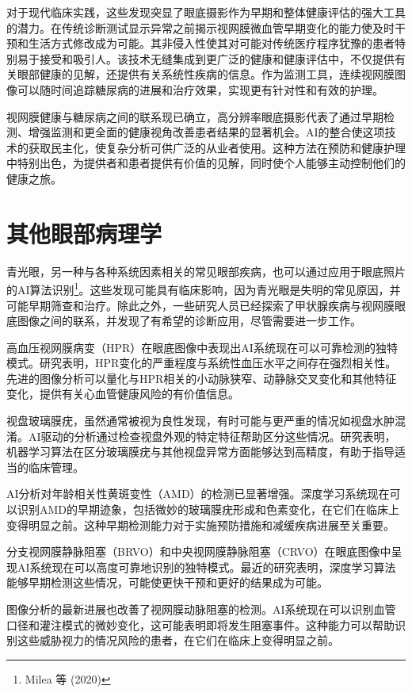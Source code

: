 \documentclass[
  Letterpaper,
]{scrbook}
\begin{document}
对于现代临床实践，这些发现突显了眼底摄影作为早期和整体健康评估的强大工具的潜力。在传统诊断测试显示异常之前揭示视网膜微血管早期变化的能力使及时干预和生活方式修改成为可能。其非侵入性使其对可能对传统医疗程序犹豫的患者特别易于接受和吸引人。该技术无缝集成到更广泛的健康和健康评估中，不仅提供有关眼部健康的见解，还提供有关系统性疾病的信息。作为监测工具，连续视网膜图像可以随时间追踪糖尿病的进展和治疗效果，实现更有针对性和有效的护理。

视网膜健康与糖尿病之间的联系现已确立，高分辨率眼底摄影代表了通过早期检测、增强监测和更全面的健康视角改善患者结果的显著机会。AI的整合使这项技术的获取民主化，使复杂分析可供广泛的从业者使用。这种方法在预防和健康护理中特别出色，为提供者和患者提供有价值的见解，同时使个人能够主动控制他们的健康之旅。

\section{其他眼部病理学}\label{ux5176ux4ed6ux773cux90e8ux75c5ux7406ux5b66}

青光眼，另一种与各种系统因素相关的常见眼部疾病，也可以通过应用于眼底照片的AI算法识别\footnote{Milea
  等 (2020)}。这些发现可能具有临床影响，因为青光眼是失明的常见原因，并可能早期筛查和治疗。除此之外，一些研究人员已经探索了甲状腺疾病与视网膜眼底图像之间的联系，并发现了有希望的诊断应用，尽管需要进一步工作。

高血压视网膜病变（HPR）在眼底图像中表现出AI系统现在可以可靠检测的独特模式。研究表明，HPR变化的严重程度与系统性血压水平之间存在强烈相关性。先进的图像分析可以量化与HPR相关的小动脉狭窄、动静脉交叉变化和其他特征变化，提供有关心血管健康风险的有价值信息。

视盘玻璃膜疣，虽然通常被视为良性发现，有时可能与更严重的情况如视盘水肿混淆。AI驱动的分析通过检查视盘外观的特定特征帮助区分这些情况。研究表明，机器学习算法在区分玻璃膜疣与其他视盘异常方面能够达到高精度，有助于指导适当的临床管理。

AI分析对年龄相关性黄斑变性（AMD）的检测已显著增强。深度学习系统现在可以识别AMD的早期迹象，包括微妙的玻璃膜疣形成和色素变化，在它们在临床上变得明显之前。这种早期检测能力对于实施预防措施和减缓疾病进展至关重要。

分支视网膜静脉阻塞（BRVO）和中央视网膜静脉阻塞（CRVO）在眼底图像中呈现AI系统现在可以高度可靠地识别的独特模式。最近的研究表明，深度学习算法能够早期检测这些情况，可能使更快干预和更好的结果成为可能。

图像分析的最新进展也改善了视网膜动脉阻塞的检测。AI系统现在可以识别血管口径和灌注模式的微妙变化，这可能表明即将发生阻塞事件。这种能力可以帮助识别这些威胁视力的情况风险的患者，在它们在临床上变得明显之前。
\end{document}
